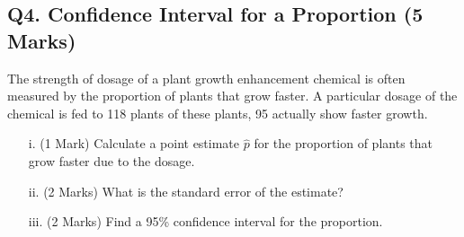 \documentclass[a4paper,12pt]{article}
\begin{document}
\subsection*{Q4. Confidence Interval for a Proportion (5 Marks)}
The strength of dosage of a plant growth enhancement chemical is often measured by the proportion of plants that grow faster. A particular dosage of the chemical is fed to 118 plants of these plants, 95 actually show faster growth.

\begin{itemize}
	\item[i.] (1 Mark) Calculate a point estimate $\hat{p}$ for the proportion of plants that grow faster due to the dosage. 									 
	\item[ii.] (2 Marks)  What is the standard error of the estimate? 			
	\item[iii.] (2 Marks) Find a 95\% confidence interval for the proportion. 					
\end{itemize}
\end{document}

